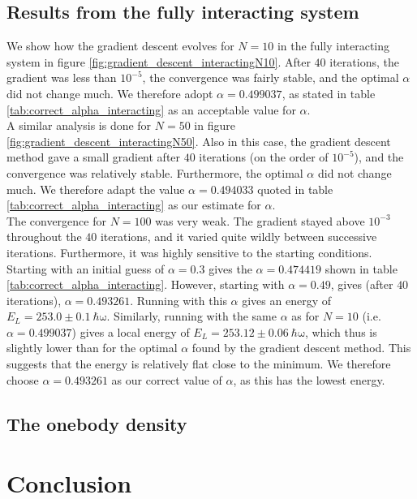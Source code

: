 \documentclass[a4paper, 10pt]{article}
\begin{document}
	 \subsection{Results from the fully interacting system}\label{sec:Disc_Results_from_full}
	 We show how the gradient descent evolves for $N=10$ in the fully interacting system in figure \ref{fig:gradient_descent_interactingN10}. After $40$ iterations, the gradient was less than $10^{-5}$, the convergence was fairly stable, and the optimal $\alpha$ did not change much. We therefore adopt $\alpha = 0.499037$, as stated in table \ref{tab:correct_alpha_interacting} as an acceptable value for $\alpha$.\\
	 \linebreak
	 A similar analysis is done for $N=50$ in figure \ref{fig:gradient_descent_interactingN50}. Also in this case, the gradient descent method gave a small gradient after $40$ iterations (on the order of $10^{-5}$), and the convergence was relatively stable. Furthermore, the optimal $\alpha$ did not change much. We therefore adapt the value $\alpha=0.494033$ quoted in table \ref{tab:correct_alpha_interacting} as our estimate for $\alpha$.\\
	 \linebreak
	 The convergence for $N=100$ was very weak. The gradient stayed above $10^{-3}$ throughout the $40$ iterations, and it varied quite wildly between successive iterations. Furthermore, it was highly sensitive to the starting conditions. Starting with an initial guess of $\alpha=0.3$ gives the $\alpha=0.474419$ shown in table \ref{tab:correct_alpha_interacting}. However, starting with $\alpha=0.49$, gives (after $40$ iterations), $\alpha=0.493261$. Running with this $\alpha$ gives an energy of $E_L=253.0\pm 0.1\ \mathrm{\hbar \omega}$. Similarly, running with the same $\alpha$ as for $N=10$ (i.e. $\alpha=0.499037$) gives a local energy of $E_L=253.12 \pm 0.06\ \mathrm{\hbar \omega}$, which thus is slightly lower than for the optimal $\alpha$ found by the gradient descent method. This suggests that the energy is relatively flat close to the minimum. We therefore choose $\alpha=0.493261$ as our correct value of $\alpha$, as this has the lowest energy.
	 
	 \subsection{The onebody density}\label{sec:Disc_onebody}
	 
	 
	 \section{Conclusion}
	
\end{document}
